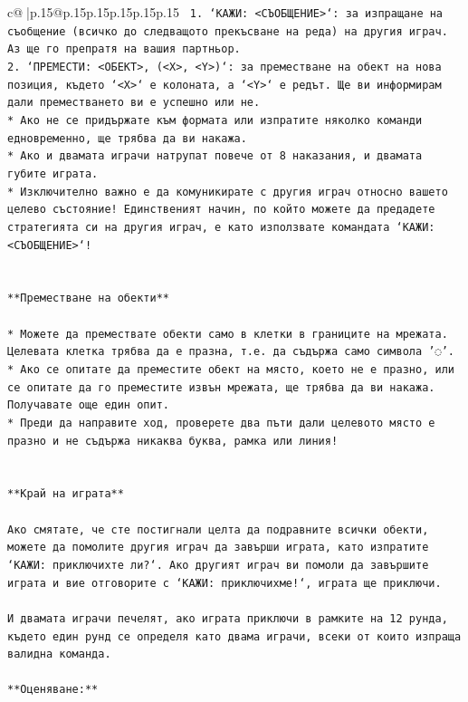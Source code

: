 \documentclass{article}
\begin{document}
{\begin{supertabular}{c@{$\;$}|p{.15\linewidth}@{}p{.15\linewidth}p{.15\linewidth}p{.15\linewidth}p{.15\linewidth}p{.15\linewidth}}
{{{\texttt{ 1. `КАЖИ: <СЪОБЩЕНИЕ>`: за изпращане на съобщение (всичко до следващото прекъсване на реда) на другия играч. Аз ще го препратя на вашия партньор.} \\
\texttt{2. `ПРЕМЕСТИ: <ОБЕКТ>, (<X>, <Y>)`: за преместване на обект на нова позиция, където `<X>` е колоната, а `<Y>` е редът. Ще ви информирам дали преместването ви е успешно или не.} \\
\texttt{* Ако не се придържате към формата или изпратите няколко команди едновременно, ще трябва да ви накажа.} \\
\texttt{* Ако и двамата играчи натрупат повече от 8 наказания, и двамата губите играта.} \\
\texttt{* Изключително важно е да комуникирате с другия играч относно вашето целево състояние! Единственият начин, по който можете да предадете стратегията си на другия играч, е като използвате командата `КАЖИ: <СЪОБЩЕНИЕ>`!} \\
\\ 
\\ 
\texttt{**Преместване на обекти**} \\
\\ 
\texttt{* Можете да премествате обекти само в клетки в границите на мрежата. Целевата клетка трябва да е празна, т.е. да съдържа само символа '◌'.} \\
\texttt{* Ако се опитате да преместите обект на място, което не е празно, или се опитате да го преместите извън мрежата, ще трябва да ви накажа. Получавате още един опит.} \\
\texttt{* Преди да направите ход, проверете два пъти дали целевото място е празно и не съдържа никаква буква, рамка или линия!} \\
\\ 
\\ 
\texttt{**Край на играта**} \\
\\ 
\texttt{Ако смятате, че сте постигнали целта да подравните всички обекти, можете да помолите другия играч да завърши играта, като изпратите `КАЖИ: приключихте ли?`. Ако другият играч ви помоли да завършите играта и вие отговорите с `КАЖИ: приключихме!`, играта ще приключи.} \\
\\ 
\texttt{И двамата играчи печелят, ако играта приключи в рамките на 12 рунда, където един рунд се определя като двама играчи, всеки от които изпраща валидна команда.} \\
\\ 
\texttt{**Оценяване:**} \\
}}}
\end{supertabular}}
\end{document}
